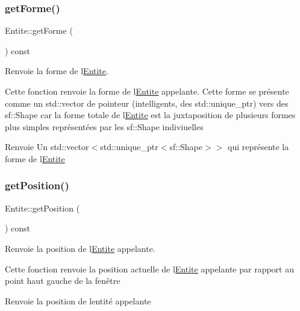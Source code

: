 \subsubsection{\texorpdfstring{get\+Forme()}{getForme()}}
{\footnotesize\ttfamily Entite\+::get\+Forme (\begin{DoxyParamCaption}{ }\end{DoxyParamCaption}) const\hspace{0.3cm}{\ttfamily [inline]}}



Renvoie la forme de l\textquotesingle{}\hyperlink{class_entite}{Entite}. 

Cette fonction renvoie la forme de l\textquotesingle{}\hyperlink{class_entite}{Entite} appelante. Cette forme se présente comme un {\ttfamily std\+::vector} de pointeur (intelligents, des {\ttfamily std\+::unique\+\_\+ptr}) vers des {\ttfamily sf\+::\+Shape} car la forme totale de l\textquotesingle{}\hyperlink{class_entite}{Entite} est la juxtaposition de plusieurs formes plus simples représentées par les {\ttfamily sf\+::\+Shape} indiviuelles \begin{DoxyReturn}{Renvoie}
Un {\ttfamily std\+::vector$<$std\+::unique\+\_\+ptr$<$sf\+::\+Shape$>$$>$} qui représente la forme de l\textquotesingle{}\hyperlink{class_entite}{Entite} 
\end{DoxyReturn}
\mbox{\label{class_entite_a6f6fd1e1f9f6ad44f0ecc74961a774d9}} 
\subsubsection{\texorpdfstring{get\+Position()}{getPosition()}}
{\footnotesize\ttfamily Entite\+::get\+Position (\begin{DoxyParamCaption}{ }\end{DoxyParamCaption}) const}



Renvoie la position de l\textquotesingle{}\hyperlink{class_entite}{Entite} appelante. 

Cette fonction renvoie la position actuelle de l\textquotesingle{}\hyperlink{class_entite}{Entite} appelante par rapport au point haut gauche de la fenêtre \begin{DoxyReturn}{Renvoie}
la position de l\textquotesingle{}entité appelante 
\end{DoxyReturn}
\mbox{\label{class_entite_a7f19439f7e7a5028f4b26eff21683de9}} 
